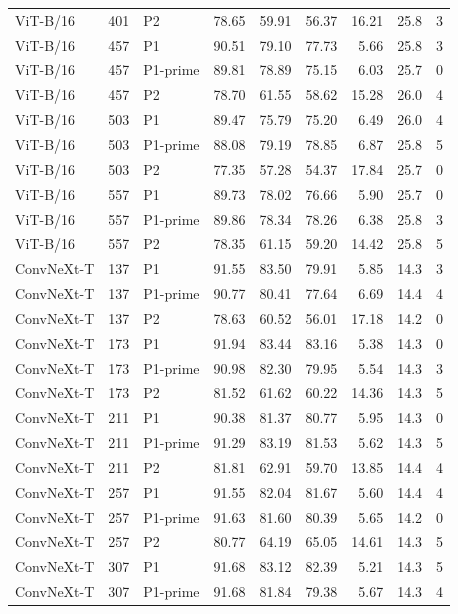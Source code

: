 {\begin{longtable}{lrlrrrrrr}
ViT-B/16 & 401 & P2 & 78.65 & 59.91 & 56.37 & 16.21 & 25.8 & 3 \\
ViT-B/16 & 457 & P1 & 90.51 & 79.10 & 77.73 & 5.66 & 25.8 & 3 \\
ViT-B/16 & 457 & P1-prime & 89.81 & 78.89 & 75.15 & 6.03 & 25.7 & 0 \\
ViT-B/16 & 457 & P2 & 78.70 & 61.55 & 58.62 & 15.28 & 26.0 & 4 \\
ViT-B/16 & 503 & P1 & 89.47 & 75.79 & 75.20 & 6.49 & 26.0 & 4 \\
ViT-B/16 & 503 & P1-prime & 88.08 & 79.19 & 78.85 & 6.87 & 25.8 & 5 \\
ViT-B/16 & 503 & P2 & 77.35 & 57.28 & 54.37 & 17.84 & 25.7 & 0 \\
ViT-B/16 & 557 & P1 & 89.73 & 78.02 & 76.66 & 5.90 & 25.7 & 0 \\
ViT-B/16 & 557 & P1-prime & 89.86 & 78.34 & 78.26 & 6.38 & 25.8 & 3 \\
ViT-B/16 & 557 & P2 & 78.35 & 61.15 & 59.20 & 14.42 & 25.8 & 5 \\
ConvNeXt-T & 137 & P1 & 91.55 & 83.50 & 79.91 & 5.85 & 14.3 & 3 \\
ConvNeXt-T & 137 & P1-prime & 90.77 & 80.41 & 77.64 & 6.69 & 14.4 & 4 \\
ConvNeXt-T & 137 & P2 & 78.63 & 60.52 & 56.01 & 17.18 & 14.2 & 0 \\
ConvNeXt-T & 173 & P1 & 91.94 & 83.44 & 83.16 & 5.38 & 14.3 & 0 \\
ConvNeXt-T & 173 & P1-prime & 90.98 & 82.30 & 79.95 & 5.54 & 14.3 & 3 \\
ConvNeXt-T & 173 & P2 & 81.52 & 61.62 & 60.22 & 14.36 & 14.3 & 5 \\
ConvNeXt-T & 211 & P1 & 90.38 & 81.37 & 80.77 & 5.95 & 14.3 & 0 \\
ConvNeXt-T & 211 & P1-prime & 91.29 & 83.19 & 81.53 & 5.62 & 14.3 & 5 \\
ConvNeXt-T & 211 & P2 & 81.81 & 62.91 & 59.70 & 13.85 & 14.4 & 4 \\
ConvNeXt-T & 257 & P1 & 91.55 & 82.04 & 81.67 & 5.60 & 14.4 & 4 \\
ConvNeXt-T & 257 & P1-prime & 91.63 & 81.60 & 80.39 & 5.65 & 14.2 & 0 \\
ConvNeXt-T & 257 & P2 & 80.77 & 64.19 & 65.05 & 14.61 & 14.3 & 5 \\
ConvNeXt-T & 307 & P1 & 91.68 & 83.12 & 82.39 & 5.21 & 14.3 & 5 \\
ConvNeXt-T & 307 & P1-prime & 91.68 & 81.84 & 79.38 & 5.67 & 14.3 & 4 \\

\end{longtable}}
